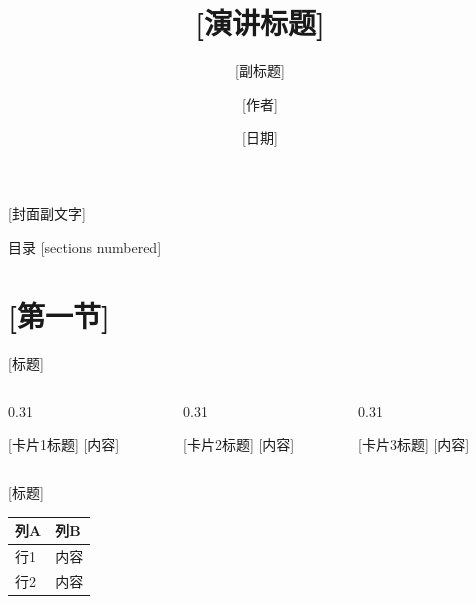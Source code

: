 \documentclass[aspectratio=169, 10pt]{beamer}
\title{[演讲标题]}
\subtitle{[副标题]}
\author{[作者]}
\institute{[机构]}
\date{[日期]}
\begin{document}

{
  \begin{frame}
    \titlepage
    \vspace{-0.5em}
    \begin{center}
      \textcolor{tealAccent}{\small [封面副文字]}
    \end{center}
  \end{frame}
}

\begin{frame}{目录}
  [sections numbered]
  \tableofcontents[hideallsubsections]
\end{frame}

\section{[第一节]}

\begin{frame}{[标题]}
  \begin{columns}[T]
    \begin{column}{0.31\textwidth}
      \begin{block}{[卡片1标题]}
        \small [内容]
      \end{block}
    \end{column}
    \begin{column}{0.31\textwidth}
      \begin{alertblock}{[卡片2标题]}
        \small [内容]
      \end{alertblock}
    \end{column}
    \begin{column}{0.31\textwidth}
      \begin{exampleblock}{[卡片3标题]}
        \small [内容]
      \end{exampleblock}
    \end{column}
  \end{columns}
\end{frame}

\begin{frame}{[标题]}
  \begin{tabularx}{\textwidth}{lX}
    \toprule
    \textbf{列A} & \textbf{列B} \\
    \midrule
    行1 & 内容 \\
    行2 & 内容 \\
    \bottomrule
  \end{tabularx}
\end{frame}
\end{document}
